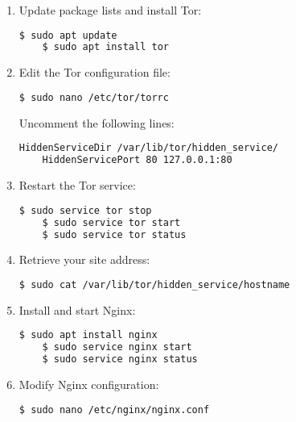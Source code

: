 \begin{enumerate}
    \item Update package lists and install Tor:
    \begin{lstlisting}[language=bash, breaklines=true, breakatwhitespace=true, columns=fullflexible]
    $ sudo apt update
    $ sudo apt install tor
    \end{lstlisting}

   \item Edit the Tor configuration file:
    \begin{lstlisting}[language=bash, breaklines=true, breakatwhitespace=true, columns=fullflexible]
    $ sudo nano /etc/tor/torrc
    \end{lstlisting}
    Uncomment the following lines:
    \begin{lstlisting}[language=bash, breaklines=true, breakatwhitespace=true, columns=fullflexible]
    HiddenServiceDir /var/lib/tor/hidden_service/
    HiddenServicePort 80 127.0.0.1:80
    \end{lstlisting}

    \item Restart the Tor service:
    \begin{lstlisting}[language=bash, breaklines=true, breakatwhitespace=true, columns=fullflexible]
    $ sudo service tor stop
    $ sudo service tor start
    $ sudo service tor status
    \end{lstlisting}

    \item Retrieve your site address:
    \begin{lstlisting}[language=bash, breaklines=true, breakatwhitespace=true, columns=fullflexible]
    $ sudo cat /var/lib/tor/hidden_service/hostname
    \end{lstlisting}

    \item Install and start Nginx:
    \begin{lstlisting}[language=bash, breaklines=true, breakatwhitespace=true, columns=fullflexible]
    $ sudo apt install nginx
    $ sudo service nginx start
    $ sudo service nginx status
    \end{lstlisting}

\item Modify Nginx configuration:
\begin{lstlisting}[language=bash, breaklines=true, breakatwhitespace=true, columns=fullflexible]
$ sudo nano /etc/nginx/nginx.conf
\end{lstlisting}


\end{enumerate}
